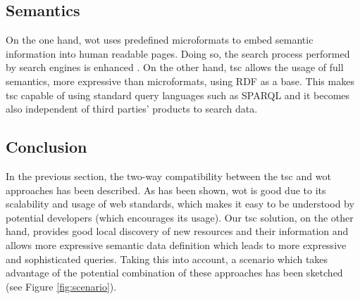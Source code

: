 \subsection{Semantics}
On the one hand, \ac{wot} uses predefined microformats to embed semantic information into human readable pages. Doing so, the search process performed
by search engines is enhanced \citep{guinard_internet_2011}. On the other hand, \ac{tsc} allows the usage of full semantics, more expressive than microformats,
using RDF as a base. This makes \ac{tsc} capable of using standard query languages such as SPARQL and it becomes also independent of third parties' products to search data.



\subsection{Conclusion}

In the previous section, the two-way compatibility between the \ac{tsc} and \ac{wot} approaches has been described. As has been shown, \ac{wot} is good due to its
scalability and usage of web standards, which makes it easy to be understood by potential developers (which encourages its usage). Our \ac{tsc}
solution, on the other hand, provides good local discovery of new resources and their information and allows more expressive semantic data
definition which leads to more expressive and sophisticated queries. Taking this into account, a scenario which takes advantage of the potential
combination of these approaches has been sketched (see Figure \ref{fig:scenario}).